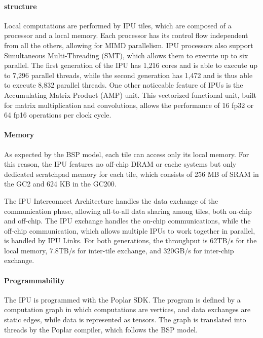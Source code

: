\documentclass[conference]{IEEEtran}
\begin{document}
\paragraph{structure}
Local computations are performed by IPU tiles, which are composed of a processor and a local memory. Each processor has its control flow independent from all the others, allowing for MIMD parallelism. IPU processors also support Simultaneous Multi-Threading (SMT), which allows them to execute up to six parallel. The first generation of the IPU has 1,216 cores and is able to execute up to 7,296 parallel threads, while the second generation has 1,472 and is thus able to execute 8,832 parallel threads. One other noticeable feature of IPUs is the Accumulating Matrix Product (AMP) unit. This vectorized functional unit, built for matrix multiplication and convolutions, allows the performance of 16 fp32 or 64 fp16 operations per clock cycle.
\paragraph{Memory}
As expected by the BSP model, each tile can access only its local memory. For this reason, the IPU features no off-chip DRAM or cache systems but only dedicated scratchpad memory for each tile, which consists of 256 MB of SRAM in the GC2 and 624 KB in the GC200.

The IPU Interconnect Architecture handles the data exchange of the communication phase, allowing all-to-all data sharing among tiles, both on-chip and off-chip. The IPU exchange handles the on-chip communications, while the off-chip communication, which allows multiple IPUs to work together in parallel, is handled by IPU Links. For both generations, the throughput is 62TB/s for the local memory, 7.8TB/s for inter-tile exchange, and 320GB/s for inter-chip exchange.
\paragraph{Programmability}
The IPU is programmed with the Poplar SDK. The program is defined by a computation graph in which computations are vertices, and data exchanges are static edges, while data is represented as tensors. The graph is translated into threads by the Poplar compiler, which follows the BSP model.

 
\end{document}
